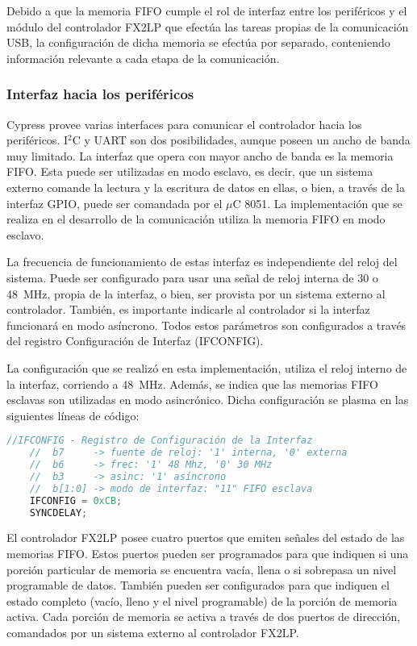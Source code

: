 	Debido a que la memoria FIFO cumple el rol de interfaz entre los periféricos y el módulo del controlador FX2LP que efectúa las tareas propias de la comunicación USB, la configuración de dicha memoria se efectúa por separado, conteniendo información relevante a cada etapa de la comunicación.
	
\subsubsection{Interfaz hacia los periféricos}
	Cypress provee varias interfaces para comunicar el controlador hacia los periféricos. I$^2$C y UART son dos posibilidades, aunque poseen un ancho de banda muy limitado. La interfaz que opera con mayor ancho de banda es la memoria FIFO. Esta puede ser utilizadas en modo esclavo, es decir, que un sistema externo comande la lectura y la escritura de datos en ellas, o bien, a través de la interfaz GPIO, puede ser comandada por el $\mu$C 8051. La implementación que se realiza en el desarrollo de la comunicación utiliza la memoria FIFO en modo esclavo.
	
	La frecuencia de funcionamiento de estas interfaz es independiente del reloj del sistema. Puede ser configurado para usar una señal de reloj interna de \si{30} o \SI{48}{\mega\hertz}, propia de la interfaz, o bien, ser provista por un sistema externo al controlador. También, es importante indicarle al controlador si la interfaz funcionará en modo asíncrono. Todos estos parámetros son configurados a través del registro Configuración de Interfaz (IFCONFIG).
	
	La configuración que se realizó en esta implementación, utiliza el reloj interno de la interfaz, corriendo a \SI{48}{\mega\hertz}. Además, se indica que las memorias FIFO esclavas son utilizadas en modo asincrónico. Dicha configuración se plasma en las siguientes líneas de código:
	
	\begin{lstlisting}[language=C,backgroundcolor=\color{gray!30}]
	//IFCONFIG - Registro de Configuración de la Interfaz
	//	b7 	   -> fuente de reloj: '1' interna, '0' externa
	//	b6 	   -> frec: '1' 48 Mhz, '0' 30 MHz
	//	b3 	   -> asinc: '1' asíncrono
	//	b[1:0] -> modo de interfaz: "11" FIFO esclava
	IFCONFIG = 0xCB;
	SYNCDELAY;
	\end{lstlisting}

	El controlador FX2LP posee cuatro puertos que emiten señales del estado de las memorias FIFO. Estos puertos pueden ser programados para que indiquen si una porción particular de memoria se encuentra vacía, llena o si sobrepasa un nivel programable de datos. También pueden ser configurados para que indiquen el estado completo (vacío, lleno y el nivel programable) de la porción de memoria activa. Cada porción de memoria se activa a través de dos puertos de dirección, comandados por un sistema externo al controlador FX2LP.
	
